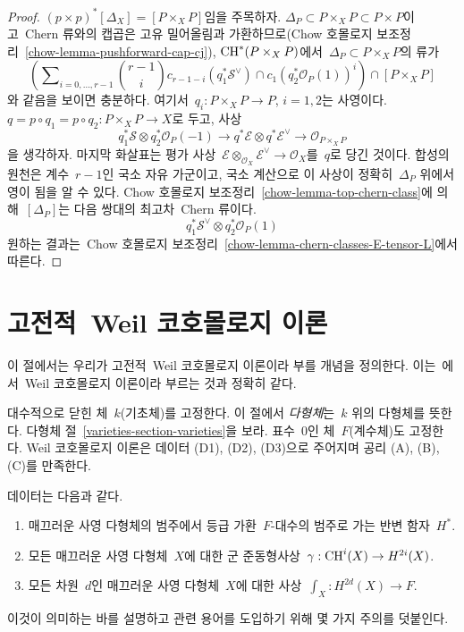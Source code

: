 \begin{proof}
$(p \times p)^*[\Delta_X] = [P \times_X P]$임을 주목하자.
$\Delta_P \subset P \times_X P \subset P \times P$이고\  Chern 류와의
캡곱은 고유 밀어올림과 가환하므로(Chow 호몰로지 보조정리\ 
\ref{chow-lemma-pushforward-cap-cj}), $\mathop{\mathrm{CH}}\nolimits^*(P \times_X P)$에서\ 
$\Delta_P \subset P \times_X P$의 류가
$$
\left(\sum\nolimits_{i = 0, \ldots, r - 1}
{r - 1 \choose i} c_{r - 1 - i}(q_1^*\mathcal{S}^\vee) \cap
c_1(q_2^*\mathcal{O}_P(1))^i\right)
\cap
[P \times_X P]
$$
와 같음을 보이면 충분하다. 여기서\ 
$q_i : P \times_X P \to P$, $i = 1, 2$는 사영이다.
$q = p \circ q_1 = p \circ q_2 : P \times_X P \to X$로 두고, 사상
$$
q_1^*\mathcal{S} \otimes q_2^*\mathcal{O}_P(-1) \to
q^*\mathcal{E} \otimes q^*\mathcal{E}^\vee \to
\mathcal{O}_{P \times_X P}
$$
을 생각하자. 마지막 화살표는 평가 사상\ 
$\mathcal{E} \otimes_{\mathcal{O}_X} \mathcal{E}^\vee \to \mathcal{O}_X$를\ 
$q$로 당긴 것이다. 합성의 원천은 계수\  $r - 1$인 국소 자유 가군이고,
국소 계산으로 이 사상이 정확히\  $\Delta_P$ 위에서 영이 됨을 알 수 있다.
Chow 호몰로지 보조정리\  \ref{chow-lemma-top-chern-class}에 의해\ 
$[\Delta_P]$는 다음 쌍대의 최고차\  Chern 류이다.
$$
q_1^*\mathcal{S}^\vee \otimes q_2^*\mathcal{O}_P(1)
$$
원하는 결과는\  Chow 호몰로지 보조정리\ 
\ref{chow-lemma-chern-classes-E-tensor-L}에서 따른다.
\end{proof}







\section{고전적\  Weil 코호몰로지 이론}
\label{section-axioms-classical}

\noindent
이 절에서는 우리가 고전적\  Weil 코호몰로지 이론이라 부를 개념을
정의한다. 이는\  \cite[Section 1.2]{Kleiman-cycles}에서\  Weil
코호몰로지 이론이라 부르는 것과 정확히 같다.

\medskip\noindent
대수적으로 닫힌 체\  $k$(기초체)를 고정한다. 이 절에서 {\it 다형체}는\ 
$k$ 위의 다형체를 뜻한다. 다형체 절\ 
\ref{varieties-section-varieties}을 보라. 표수\  $0$인 체\  $F$(계수체)도
고정한다. Weil 코호몰로지 이론은 데이터 (D1), (D2), (D3)으로 주어지며
공리 (A), (B), (C)를 만족한다.

\medskip\noindent
데이터는 다음과 같다.
\begin{enumerate}
\item[(D1)] 매끄러운 사영 다형체의 범주에서 등급 가환\ 
$F$-대수의 범주로 가는 반변 함자\  $H^*$.
\item[(D2)] 모든 매끄러운 사영 다형체\  $X$에 대한 군 준동형사상\ 
$\gamma : \mathop{\mathrm{CH}}\nolimits^i(X) \to H^{2i}(X)$.
\item[(D3)] 모든 차원\  $d$인 매끄러운 사영 다형체\  $X$에 대한 사상\ 
$\int_X : H^{2d}(X) \to F$.
\end{enumerate}
이것이 의미하는 바를 설명하고 관련 용어를 도입하기 위해 몇 가지
주의를 덧붙인다.

